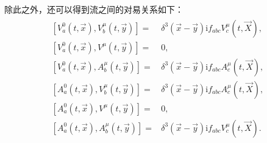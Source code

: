 \documentclass[aps,tightenlines,16pt]{ctexart}
\numberwithin{equation}{section}
\newcommand{\bm}[1]{\mbox{\boldmath{$#1$}}}
\begin{document}
除此之外，还可以得到流之间的对易关系如下：
\begin{align}
   \begin{aligned}
   [V^0_a(t,\vec{x}),V^{\mu}_b(t,\vec{y})] =& \delta^3(\vec{x}-\vec{y})\mbox{i}f_{abc}V^{\mu}_c(t,\vec{X}),\\
   [V^0_a(t,\vec{x}),V^{\mu}(t,\vec{y})] =& 0,\\
   [V^0_a(t,\vec{x}),A^{\mu}_b(t,\vec{y})] =& \delta^3(\vec{x}-\vec{y})\mbox{i}f_{abc}A^{\mu}_c(t,\vec{X}),\\
   [A^0_a(t,\vec{x}),V^{\mu}_b(t,\vec{y})] =& \delta^3(\vec{x}-\vec{y})\mbox{i}f_{abc}A^{\mu}_c(t,\vec{X}),\\
   [A^0_a(t,\vec{x}),V^{\mu}(t,\vec{y})] =& 0,\\
   [A^0_a(t,\vec{x}),A^{\mu}_b(t,\vec{y})] =& \delta^3(\vec{x}-\vec{y})\mbox{i}f_{abc}V^{\mu}_c(t,\vec{X}).\\
   \end{aligned}
\end{align}



\end{document}
